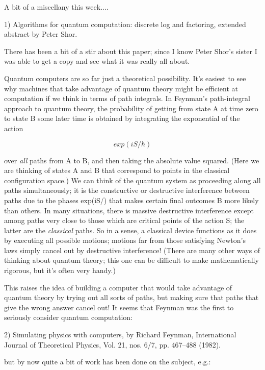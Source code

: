 

A bit of a miscellany this week....

1) Algorithms for quantum computation: discrete log and factoring,
extended abstract by Peter Shor.

There has been a bit of a stir about this paper; since I know Peter
Shor's sister I was able to get a copy and see what it was really all
about.  

Quantum computers are so far just a theoretical possibility.  It's
easiest to see why machines that take advantage of quantum theory might
be efficient at computation if we think in terms of path integrals.  In
Feynman's path-integral approach to quantum theory, the probability of
getting from state A at time zero to state B some later time is obtained
by integrating the exponential of the action


$$

                        exp(iS/\hbar ) 
$$
    

over \emph{all} paths from A to B, and then taking the absolute value
squared.  (Here we are thinking of states A and B that correspond to
points in the classical configuration space.)  We can think of the
quantum system as proceeding along all paths simultaneously; it is the
constructive or destructive interference between paths due to the phases
exp(iS/\hbar ) that makes certain final outcomes B more likely than
others.  In many situations, there is massive destructive interference
except among paths very close to those which are critical points of the
action S; the latter are the \emph{classical} paths.  So in a sense, a
classical device functions as it does by executing all possible motions;
motions far from those satisfying Newton's laws simply cancel out by
destructive interference!  (There are many other ways of thinking about
quantum theory; this one can be difficult to make mathematically
rigorous, but it's often very handy.)  

This raises the idea of building a computer that would take advantage of
quantum theory by trying out all sorts of paths, but making sure that
paths that give the wrong answer cancel out!  It seems that Feynman was
the first to seriously consider quantum computation:

2) Simulating physics with computers, by Richard Feynman, 
International Journal of Theoretical Physics, Vol. 21, nos. 6/7, 
pp. 467--488 (1982).

but by now quite a bit of work has been done on the subject, e.g.:

